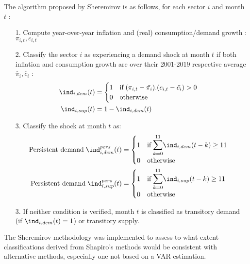 The algorithm proposed by Sheremirov is as follows, for each sector $i$ and month $t$ :
\begin{itemize}
    \item[1.] Compute year-over-year inflation and (real) consumption/demand growth : $\pi_{i,t},c_{i,t}$
    \item[2.] Classify the sector $i$ as experiencing a demand shock at month $t$ if both inflation and consumption growth are over their 2001-2019 respective average $\tilde{\pi_i},\tilde{c_i}$ : 
    \begin{align*}
        \ind_{i,dem}(t) &= \begin{cases} 1 \quad \textrm{if} \; (\pi_{i,t}-\tilde{\pi_i}).(c_{i,t}-\tilde{c_i})>0 \\ 0 \quad \textrm{otherwise} \end{cases} \\ 
        \ind_{i,sup}(t) &= 1 - \ind_{i,dem}(t)
    \end{align*}
    \item[3.] Classify the shock at month $t$ as:
    \begin{align*}
        \textrm{Persistent demand} \; \ind_{i,dem}^{pers}(t) &= \begin{cases} 1 \quad \textrm{if} \; \mathlarger{\mathlarger{\sum}}_{k=0}^{11} \ind_{i,dem}(t-k) \geq 11 \\ 0 \quad \textrm{otherwise} \end{cases} \\ 
        \textrm{Persistent demand} \; \ind_{i,sup}^{pers}(t) &= \begin{cases} 1 \quad \textrm{if} \; \mathlarger{\mathlarger{\sum}}_{k=0}^{11} \ind_{i,sup}(t-k) \geq 11 \\ 0 \quad \textrm{otherwise} \end{cases} \\ 
    \end{align*}
    \item[3.] If neither condition is verified, month $t$ is classified as transitory demand (if $\ind_{i,dem}(t)=1$) or transitory supply.
\end{itemize}
\quad The Sheremirov methodology was implemented to assess to what extent classifications derived from Shapiro's methods would be consistent with alternative methods, especially one not based on a VAR estimation.

\clearpage